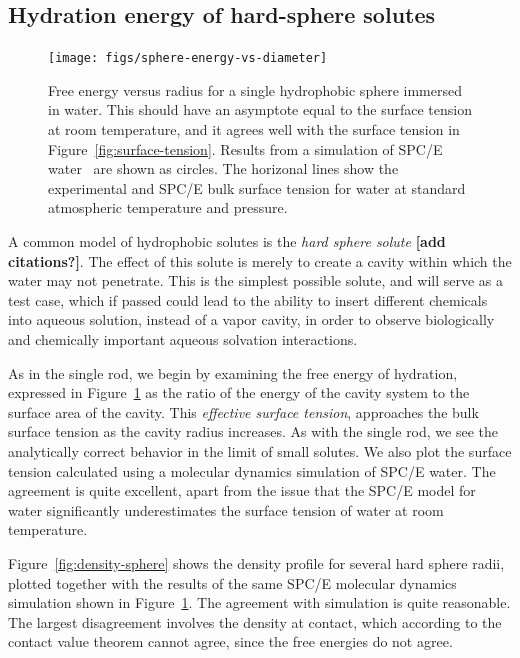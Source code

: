 \documentclass[letterpaper,twocolumn,amsmath,amssymb,prb]{revtex4-1}
\newcommand{\red}[1]{{\bf \color{red} #1}}
\newcommand{\fixme}[1]{\red{[#1]}}
\begin{document}
\subsection{Hydration energy of hard-sphere solutes}

\begin{figure}
\begin{center}
\texttt{[image: figs/sphere-energy-vs-diameter]}
\end{center}
\caption{ Free energy versus radius for a single hydrophobic sphere
  immersed in water. This should have an asymptote equal to the
  surface tension at room temperature, and it agrees well with the
  surface tension in Figure~\ref{fig:surface-tension}. Results from a
  simulation of SPC/E water~\cite{huang2001shs} are shown as circles.
  The horizonal lines show the experimental and SPC/E bulk surface
  tension for water at standard atmospheric temperature and
  pressure. }
\label{fig:sphere-energy-vs-diameter}
\end{figure}

A common model of hydrophobic solutes is the \emph{hard sphere solute}
\fixme{add citations?}.  The effect of this solute is merely to create
a cavity within which the water may not penetrate.  This is the
simplest possible solute, and will serve as a test case, which if
passed could lead to the ability to insert different chemicals into
aqueous solution, instead of a vapor cavity, in order to observe
biologically and chemically important aqueous solvation interactions.

As in the single rod, we begin by examining the free energy of
hydration, expressed in Figure~\ref{fig:sphere-energy-vs-diameter} as
the ratio of the energy of the cavity system to the surface area of
the cavity.  This \emph{effective surface tension}, approaches the
bulk surface tension as the cavity radius increases.  As with the
single rod, we see the analytically correct behavior in the limit of
small solutes.  We also plot the surface tension calculated using a
molecular dynamics simulation of SPC/E water\cite{huang2001shs}.  The
agreement is quite excellent, apart from the issue that the SPC/E
model for water significantly underestimates the surface tension of
water at room temperature\cite{vega2007surface}.

Figure~\ref{fig:density-sphere} shows the density profile for several
hard sphere radii, plotted together with the results of the same
SPC/E molecular dynamics simulation shown in
Figure~\ref{fig:sphere-energy-vs-diameter}\cite{huang2001shs}.  The
agreement with simulation is quite reasonable.  The largest
disagreement involves the density at contact, which according to the
contact value theorem cannot agree, since the free energies do not
agree.
\end{document}

